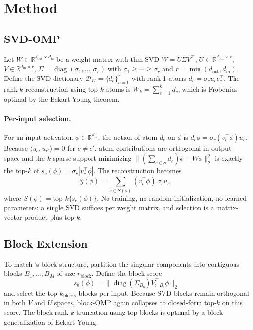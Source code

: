\section{Method}
\label{sec:method}

\subsection{SVD-OMP}
\label{sec:svdomp}

Let $W \in \mathbb{R}^{d_\text{out} \times d_\text{in}}$ be a weight matrix with thin SVD $W = U\Sigma V^\top$, $U \in \mathbb{R}^{d_\text{out} \times r}$, $V \in \mathbb{R}^{d_\text{in} \times r}$, $\Sigma = \operatorname{diag}(\sigma_1, \dots, \sigma_r)$ with $\sigma_1 \geq \cdots \geq \sigma_r$ and $r = \min(d_\text{out}, d_\text{in})$. Define the SVD dictionary $\mathcal{D}_W = \{d_c\}_{c=1}^r$ with rank-1 atoms $d_c = \sigma_c u_c v_c^\top$. The rank-$k$ reconstruction using top-$k$ atoms is $W_k = \sum_{c=1}^k d_c$, which is Frobenius-optimal by the Eckart-Young theorem.

\paragraph{Per-input selection.} For an input activation $\phi \in \mathbb{R}^{d_\text{in}}$, the action of atom $d_c$ on $\phi$ is $d_c \phi = \sigma_c (v_c^\top \phi) u_c$. Because $\langle u_c, u_{c'} \rangle = 0$ for $c \neq c'$, atom contributions are orthogonal in output space and the $k$-sparse support minimizing $\|(\sum_{c \in S} d_c) \phi - W \phi\|_2^2$ is exactly the top-$k$ of $s_c(\phi) = \sigma_c |v_c^\top \phi|$. The reconstruction becomes
\begin{equation}
\hat{y}(\phi) = \sum_{c \in S(\phi)} (v_c^\top \phi) \, \sigma_c u_c,
\end{equation}
where $S(\phi) = \text{top-}k\{s_c(\phi)\}$. No training, no random initialization, no learned parameters; a single SVD suffices per weight matrix, and selection is a matrix-vector product plus top-$k$.

\subsection{Block Extension}
\label{sec:block}

To match \bsf's block structure, partition the singular components into contiguous blocks $B_1, \dots, B_M$ of size $r_\text{block}$. Define the block score
\begin{equation}
s_b(\phi) = \|\operatorname{diag}(\Sigma_{B_b}) V_{:,B_b}^\top \phi\|_2
\label{eq:block-score}
\end{equation}
and select the top-$k_\text{blocks}$ blocks per input. Because SVD blocks remain orthogonal in both $V$ and $U$ spaces, block-OMP again collapses to closed-form top-$k$ on this score. The block-rank-$k$ truncation using top blocks is optimal by a block generalization of Eckart-Young.

